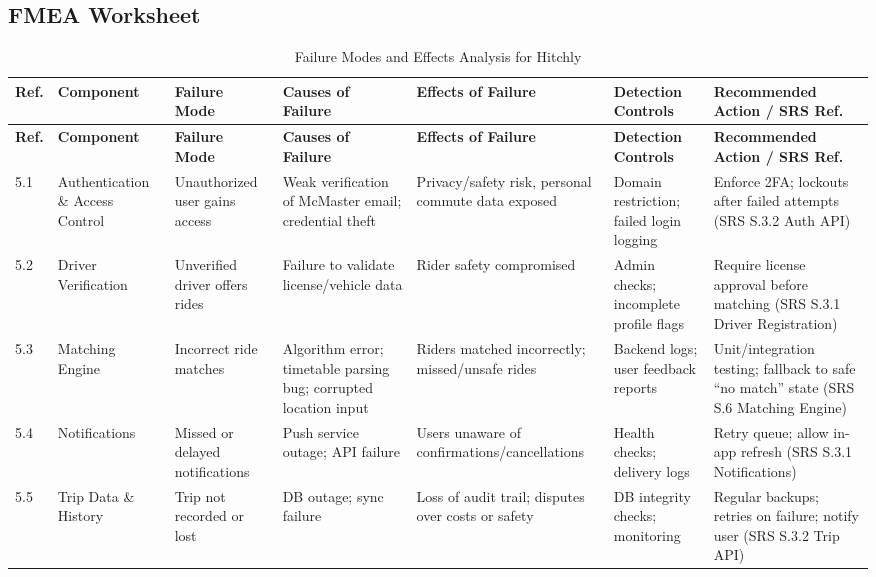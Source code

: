 \documentclass{article}
\begin{document}
\subsection{FMEA Worksheet}
\begingroup
\footnotesize
\begin{longtable}{|p{0.5cm}|p{2cm}|p{2cm}|p{2cm}|p{2cm}|p{2cm}|p{2cm}|}
\caption{Failure Modes and Effects Analysis for Hitchly} \label{tbl:FMEA} \\ 
\hline
\textbf{Ref.} & \textbf{Component} & \textbf{Failure Mode} & \textbf{Causes of Failure} & \textbf{Effects of Failure} & \textbf{Detection Controls} & \textbf{Recommended Action / SRS Ref.} \\ \hline
\endfirsthead
\hline
\textbf{Ref.} & \textbf{Component} & \textbf{Failure Mode} & \textbf{Causes of Failure} & \textbf{Effects of Failure} & \textbf{Detection Controls} & \textbf{Recommended Action / SRS Ref.} \\ \hline
\endhead
\hline
\endfoot

5.1 & Authentication \& Access Control & Unauthorized user gains access & Weak verification of McMaster email; credential theft & Privacy/safety risk, personal commute data exposed & Domain restriction; failed login logging & Enforce 2FA; lockouts after failed attempts (SRS S.3.2 Auth API) \\ \hline

5.2 & Driver Verification & Unverified driver offers rides & Failure to validate license/vehicle data & Rider safety compromised & Admin checks; incomplete profile flags & Require license approval before matching (SRS S.3.1 Driver Registration) \\ \hline

5.3 & Matching Engine & Incorrect ride matches & Algorithm error; timetable parsing bug; corrupted location input & Riders matched incorrectly; missed/unsafe rides & Backend logs; user feedback reports & Unit/integration testing; fallback to safe “no match” state (SRS S.6 Matching Engine) \\ \hline

5.4 & Notifications & Missed or delayed notifications & Push service outage; API failure & Users unaware of confirmations/cancellations & Health checks; delivery logs & Retry queue; allow in-app refresh (SRS S.3.1 Notifications) \\ \hline

5.5 & Trip Data \& History & Trip not recorded or lost & DB outage; sync failure & Loss of audit trail; disputes over costs or safety & DB integrity checks; monitoring & Regular backups; retries on failure; notify user (SRS S.3.2 Trip API) \\ \hline


\end{longtable}
\end{document}
